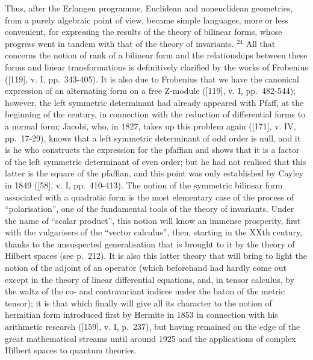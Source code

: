 Thus, after the Erlangen programme, Euclidean and noneuclidean geometries, from a purely algebraic point of view, became simple languages, more or less convenient, for expressing the results of the theory of bilinear forms, whose progress went in tandem with that of the theory of invariants. \(^{24}\) All that concerns the notion of rank of a bilinear form and the relationships between these forms and linear transformations is definitively clarified by the works of Frobenius ({[}119{]}, v. I, pp.~343-405). It is also due to Frobenius that we have the canonical expression of an alternating form on a free Z-module ({[}119{]}, v. I, pp.~482-544); however, the left symmetric determinant had already appeared with Pfaff, at the beginning of the century, in connection with the reduction of differential forms to a normal form; Jacobi, who, in 1827, takes up this problem again ({[}171{]}, v. IV, pp.~17-29), knows that a left symmetric determinant of odd order is null, and it is he who constructs the expression for the pfaffian and shows that it is a factor of the left symmetric determinant of even order; but he had not realised that this latter is the square of the pfaffian, and this point was only established by Cayley in 1849 ({[}58{]}, v. I, pp.~410-413). The notion of the symmetric bilinear form associated with a quadratic form is the most elementary case of the process of ``polarisation'', one of the fundamental tools of the theory of invariants. Under the name of ``scalar product'', this notion will know an immense prosperity, first with the vulgarisers of the ``vector calculus'', then, starting in the XXth century, thanks to the unsuspected generalisation that is brought to it by the theory of Hilbert spaces (see p.~212). It is also this latter theory that will bring to light the notion of the adjoint of an operator (which beforehand had hardly come out except in the theory of linear differential equations, and, in tensor calculus, by the waltz of the co- and contravariant indices under the baton of the metric tensor); it is that which finally will give all its character to the notion of hermitian form introduced first by Hermite in 1853 in connection with his arithmetic research ({[}159{]}, v. I, p.~237), but having remained on the edge of the great mathematical streams until around 1925 and the applications of complex Hilbert spaces to quantum theories.

